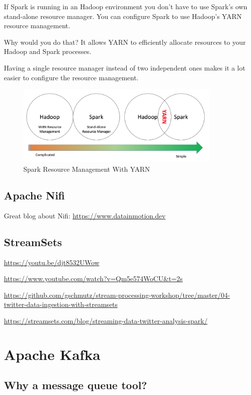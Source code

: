 \documentclass[12pt, numbers=noenddot]{scrreprt} %
\begin{document}
If Spark is running in an Hadoop environment you don’t have to use Spark’s own stand-alone resource manager. You can configure Spark to use Hadoop’s YARN resource management.

Why would you do that?
It allows YARN to efficiently allocate resources to your Hadoop and Spark processes.

Having a single resource manager instead of two independent ones makes it a lot easier to configure the resource management.

\begin{figure}[htbp]
  \centering
     \includegraphics[width=0.9\textwidth]{images/Spark-Yarn.png}
  \caption{Spark Resource Management With YARN}
  \label{fig:Bild1}
\end{figure}


\section{Apache Nifi}
Great blog about Nifi:
\url{https://www.datainmotion.dev}

\section{StreamSets}

\url{https://youtu.be/djt8532UWow}

\url{https://www.youtube.com/watch?v=Qm5e574WoCU&t=2s}

\url{https://github.com/gschmutz/stream-processing-workshop/tree/master/04-twitter-data-ingestion-with-streamsets}

\url{https://streamsets.com/blog/streaming-data-twitter-analysis-spark/}

\chapter{Apache Kafka}

\section{Why a message queue tool?}
\end{document}
